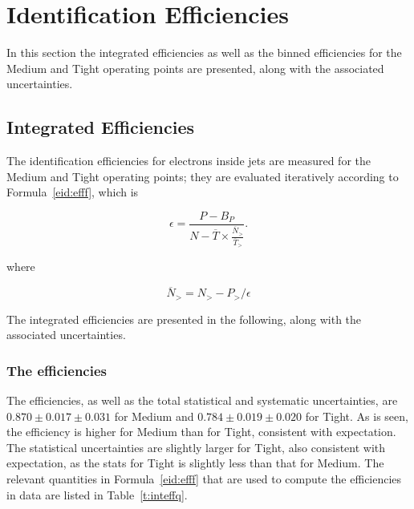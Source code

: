 
\section{Identification Efficiencies}\label{s:eideff}

In this section the integrated efficiencies as well as the binned efficiencies
for the Medium and Tight operating points are presented, along with the
associated uncertainties.


\subsection{Integrated Efficiencies}

The identification efficiencies for electrons inside jets are measured for the
Medium and Tight operating points; they are evaluated iteratively according to
Formula~\ref{eid:efff}, which is

$$
	\epsilon = \frac{P-B_P}{N - \overline{T} \times \frac{\overline{N}_>}{\overline{T}_>}}.
$$

where

$$\overline{N}_> = N_> - P_> / \epsilon $$

The integrated efficiencies are presented in the following, along with the
associated uncertainties.

\subsubsection{The efficiencies}

The efficiencies, as well as the total statistical and systematic
uncertainties, are $\mathbf{0.870\pm 0.017 \pm 0.031}$ for Medium and
$\mathbf{0.784 \pm 0.019 \pm 0.020}$ for Tight. As is seen, the efficiency is
higher for Medium than for Tight, consistent with expectation. The statistical
uncertainties are slightly larger for Tight, also consistent with expectation,
as the stats for Tight is slightly less than that for Medium. The relevant
quantities in Formula~\ref{eid:efff} that are used to compute the efficiencies
in data are listed in Table~\ref{t:inteffq}.

